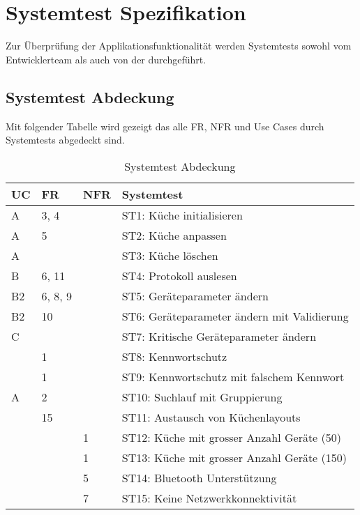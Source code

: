 \pagebreak
\section{Systemtest Spezifikation}
\label{s:Systemtest_Spezifikation}
Zur Überprüfung der Applikationsfunktionalität werden Systemtests sowohl vom Entwicklerteam als auch von der \fluxron{} durchgeführt.

\subsection{Systemtest Abdeckung}
Mit folgender Tabelle wird gezeigt das alle \ac{FR}, \ac{NFR} und Use Cases durch Systemtests abgedeckt sind.

\begin{table}[H]
\begin{tabularx}{\textwidth}{ l | l | l | X}
\textbf{\acs{UC}}& \textbf{\acs{FR}} & \textbf{\acs{NFR}} &\textbf{Systemtest}\\ \hline
A  & 3, 4 & & ST1: Küche initialisieren \\ \hline
A  & 5 & & ST2: Küche anpassen \\ \hline
A  &  & & ST3: Küche löschen \\ \hline
B  & 6, 11 & &  ST4: Protokoll auslesen \\ \hline
B2 & 6, 8, 9 & &  ST5: Geräteparameter ändern \\ \hline
B2 & 10 & & ST6: Geräteparameter ändern mit Validierung \\ \hline
C  &  & &  ST7: Kritische Geräteparameter ändern \\ \hline
   & 1 & &  ST8: Kennwortschutz  \\ \hline
   & 1 & & ST9: Kennwortschutz mit falschem Kennwort \\ \hline
A  & 2 & &  ST10: Suchlauf mit Gruppierung \\ \hline
   & 15 & &  ST11: Austausch von Küchenlayouts \\ \hline
   & & 1 &  ST12: Küche mit grosser Anzahl Geräte (50) \\ \hline
   & & 1 &  ST13: Küche mit grosser Anzahl Geräte (150) \\ \hline
   & & 5 &  ST14: Bluetooth Unterstützung \\ \hline
   & & 7 &  ST15: Keine Netzwerkkonnektivität \\
\end{tabularx}
\caption{Systemtest Abdeckung}
\end{table}

